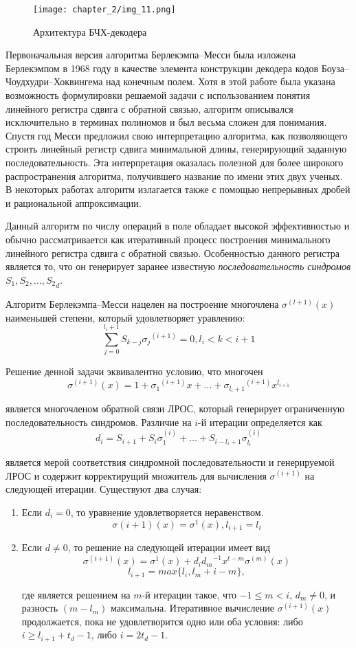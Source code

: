 \begin{figure}[htbp]
\begin{center}
\texttt{[image: chapter\_2/img\_11.png]}
\end{center}
\caption{Архитектура БЧХ-декодера}
\label{img_11}
\end{figure}

Первоначальная версия алгоритма Берлекэмпа–Месси была изложена Берлекэмпом в 1968 году в качестве 
элемента конструкции декодера кодов Боуза–Чоудхудри–Хоквингема над конечным полем. Хотя в этой работе была 
указана возможность формулировки решаемой задачи с использованием понятия линейного регистра сдвига с 
обратной связью, алгоритм описывался исключительно в терминах полиномов и был весьма сложен для понимания. 
Спустя год Месси предложил свою интерпретацию алгоритма, как позволяющего строить линейный регистр сдвига 
минимальной длины, генерирующий заданную последовательность. Эта интерпретация оказалась полезной для более 
широкого распространения алгоритма, получившего название по имени этих двух ученых. В некоторых работах 
алгоритм излагается также с помощью непрерывных дробей и рациональной аппроксимации.

Данный алгоритм по числу операций в поле обладает высокой эффективностью и обычно рассматривается как 
итеративный процесс построения минимального линейного регистра сдвига с обратной связью. Особенностью данного 
регистра является то, что он генерирует заранее известную \emph{последовательность синдромов} $S_1, S_2, 
..., {S_2}_d$.

Алгоритм Берлекэмпа–Месси нацелен на построение многочлена $\sigma^{(l+1)}(x)$ наименьшей степени, который
удовлетворяет уравлению: $$\sum \limits_{j=0}^{l_i+1}S_{k-j}{\sigma_j}^{(i+1)}=0, l_i<k<i+1$$

Решение денной задачи эквивалентно условию, что многочен
$$\sigma^{(i+1)}(x)=1+{\sigma_1}^{(i+1)}x+\ldots+{\sigma_{l_i+1}}^{(i+1)}x^{l_{i+1}}$$

является многочленом обратной связи ЛРОС, который генерирует ограниченную последовательность синдромов.
Различие на $i$-й итерации определяется как
$$d_i=S_{i+1}+S_i\sigma_1^{(i)}+\ldots+S_{i-l_i+1}\sigma_{l_i}^{(i)}$$

является мерой соответствия синдромной последовательности и генерируемой ЛРОС и содержит корректирущий
множитель для вычисления $\sigma^{(i+1)}$ на следующей итерации. Существуют два случая:
\begin{enumerate}
\item Если $d_i=0$, то уравнение удовлетворяется неравенством.
$$\sigma{(i+1)}(x)=\sigma^1(x), l_{i+1}=l_i$$

\item Если $d\ne0$, то решение на следующей итерации имеет вид
$$\sigma^{(i+1)}(x)=\sigma^1(x)+d_i {d_m}^{-1}x^{t-m}\sigma^{(m)}(x)$$
$$l_{i+1}=max\{l_i, l_m+i-m\},$$

где является решением на $m$-й итерации такое, что $-1\le m<i$, $d_m\ne 0$, и разность $(m-l_m)$ максимальна.
Итеративное вычисление $\sigma^{(i+1)}(x)$ продолжается, пока не удовлетворится одно или оба условия: либо
$i\ge l_{i+1}+t_d-1$, либо $i=2t_d-1$.
\end{enumerate}
 
